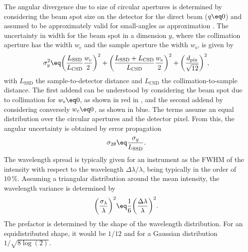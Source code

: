 \documentclass[\main/dresen_thesis.tex]{subfiles}
\begin{document}
    The angular divergence due to size of circular apertures is determined by considering the beam spot size on the detector for the direct beam ($q \eq 0$) and assumed to be approximately valid for small-angles as approximation \cite{Pedersen_1990_Analy}.
    The uncertainty in width for the beam spot in a dimension $y$, where the collimation aperture has the width $w_\mathrm{c}$ and the sample aperture the width $w_\mathrm{s}$, is given by \cite{Mildner_2005_Arefr, Hammouda_2006_Thesa}
    \begin{align}
      \sigma_y^2 \eq
        \biggl( \frac{L_\mathrm{SSD}}{L_\mathrm{CSD}} \frac{w_\mathrm{c}}{2} \biggr)^2 +
        \biggl( \frac{L_\mathrm{SSD} + L_\mathrm{CSD}}{L_\mathrm{CSD}} \frac{w_\mathrm{s}}{2} \biggr)^2 +
        \biggl( \frac{d_\mathrm{pix}}{\sqrt{12}} \biggr)^2,
    \end{align}
    with $L_\mathrm{SSD}$ the sample-to-detector distance and $L_\mathrm{CSD}$ the collimation-to-sample distance.
    The first addend can be understood by considering the beam spot due to collimation for $w_\mathrm{s} \eq 0$, as shown in red in , and the second addend by considering conversely $w_\mathrm{c} \eq 0$, as shown in blue.
    The terms assume an equal distribution over the circular apertures and the detector pixel.
    From this, the angular uncertainty is obtained by error propagation
    \begin{align}
      \sigma_{2 \theta} \eq \frac{\sigma_{y}}{L_{\mathrm{SSD}}}.
    \end{align}
    The wavelength spread is typically given for an instrument as the FWHM of the intensity with respect to the wavelength $\Delta \lambda / \lambda$, being typically in the order of $10 \, \%$.
    Assuming a triangular distribution around the mean intensity, the wavelength variance is determined by
    \begin{align}
      \biggl( \frac{\sigma_\lambda}{\lambda} \biggr)^2 \eq \frac{1}{6} \biggl( \frac{\Delta \lambda}{\lambda} \biggr)^2.
    \end{align}
    The prefactor is determined by the shape of the wavelength distribution. For an equidistributed shape, it would be $1/12$ and for a Gaussian distribution $1/\sqrt{8\log(2)}$.
\end{document}
